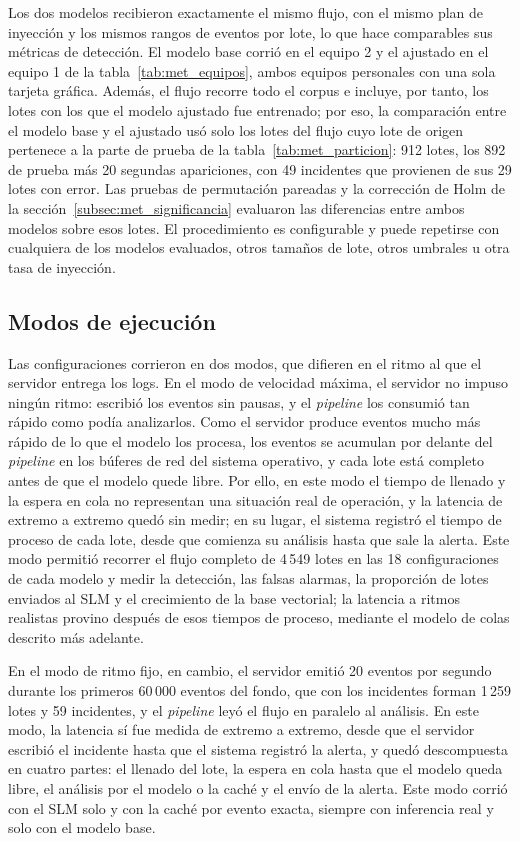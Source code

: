 Los dos modelos recibieron exactamente el mismo flujo, con el mismo plan de inyección y los mismos rangos de eventos por lote, lo que hace comparables sus métricas de detección. El modelo base corrió en el equipo 2 y el ajustado en el equipo 1 de la tabla~\ref{tab:met_equipos}, ambos equipos personales con una sola tarjeta gráfica. Además, el flujo recorre todo el corpus e incluye, por tanto, los lotes con los que el modelo ajustado fue entrenado; por eso, la comparación entre el modelo base y el ajustado usó solo los lotes del flujo cuyo lote de origen pertenece a la parte de prueba de la tabla~\ref{tab:met_particion}: 912 lotes, los 892 de prueba más 20 segundas apariciones, con 49 incidentes que provienen de sus 29 lotes con error. Las pruebas de permutación pareadas y la corrección de Holm de la sección~\ref{subsec:met_significancia} evaluaron las diferencias entre ambos modelos sobre esos lotes. El procedimiento es configurable y puede repetirse con cualquiera de los modelos evaluados, otros tamaños de lote, otros umbrales u otra tasa de inyección.

\subsection{Modos de ejecución}

Las configuraciones corrieron en dos modos, que difieren en el ritmo al que el servidor entrega los logs. En el modo de velocidad máxima, el servidor no impuso ningún ritmo: escribió los eventos sin pausas, y el \textit{pipeline} los consumió tan rápido como podía analizarlos. Como el servidor produce eventos mucho más rápido de lo que el modelo los procesa, los eventos se acumulan por delante del \textit{pipeline} en los búferes de red del sistema operativo, y cada lote está completo antes de que el modelo quede libre. Por ello, en este modo el tiempo de llenado y la espera en cola no representan una situación real de operación, y la latencia de extremo a extremo quedó sin medir; en su lugar, el sistema registró el tiempo de proceso de cada lote, desde que comienza su análisis hasta que sale la alerta. Este modo permitió recorrer el flujo completo de 4\,549 lotes en las 18 configuraciones de cada modelo y medir la detección, las falsas alarmas, la proporción de lotes enviados al SLM y el crecimiento de la base vectorial; la latencia a ritmos realistas provino después de esos tiempos de proceso, mediante el modelo de colas descrito más adelante.

En el modo de ritmo fijo, en cambio, el servidor emitió 20 eventos por segundo durante los primeros 60\,000 eventos del fondo, que con los incidentes forman 1\,259 lotes y 59 incidentes, y el \textit{pipeline} leyó el flujo en paralelo al análisis. En este modo, la latencia sí fue medida de extremo a extremo, desde que el servidor escribió el incidente hasta que el sistema registró la alerta, y quedó descompuesta en cuatro partes: el llenado del lote, la espera en cola hasta que el modelo queda libre, el análisis por el modelo o la caché y el envío de la alerta. Este modo corrió con el SLM solo y con la caché por evento exacta, siempre con inferencia real y solo con el modelo base.

